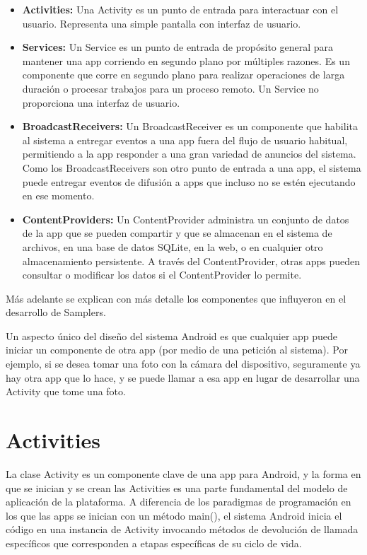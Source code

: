 \begin{itemize}
	\item \textbf{Activities:} Una Activity es un punto de entrada para interactuar con el usuario. Representa una simple pantalla con interfaz de usuario.
	
	\item \textbf{Services:} Un Service es un punto de entrada de propósito general para mantener una app corriendo en segundo plano por múltiples razones. Es un componente que corre en segundo plano para realizar operaciones de larga duración o procesar trabajos para un proceso remoto. Un Service no proporciona una interfaz de usuario.
	
	\item \textbf{BroadcastReceivers:} Un BroadcastReceiver es un componente que habilita al sistema a entregar eventos a una app fuera del flujo de usuario habitual, permitiendo a la app responder a una gran variedad de anuncios del sistema. Como los BroadcastReceivers son otro punto de entrada a una app, el sistema puede entregar eventos de difusión a apps que incluso no se estén ejecutando en ese momento.
	
	
	\item \textbf{ContentProviders:} Un ContentProvider administra un conjunto de datos de la app que se pueden compartir y que se almacenan en el sistema de archivos, en una base de datos SQLite, en la web, o en cualquier otro almacenamiento persistente. A través del ContentProvider, otras apps pueden consultar o modificar los datos si el ContentProvider lo permite.
	
	
\end{itemize}

Más adelante se explican con más detalle los componentes que influyeron en el desarrollo de Samplers.

Un aspecto único del diseño del sistema Android es que cualquier app puede iniciar un componente de otra app (por medio de una petición al sistema). Por ejemplo, si se desea tomar una foto con la cámara del dispositivo, seguramente ya hay otra app que lo hace, y se puede llamar a esa app en lugar de desarrollar una Activity que tome una foto.
\cite{androidDocs}

\section{Activities}
La clase Activity es un componente clave de una app para Android, y la forma en que se inician y se crean las Activities es una parte fundamental del modelo de aplicación de la plataforma. A diferencia de los paradigmas de programación en los que las apps se inician con un método main(), el sistema Android inicia el código en una instancia de Activity invocando métodos de devolución de llamada específicos que corresponden a etapas específicas de su ciclo de vida. 

